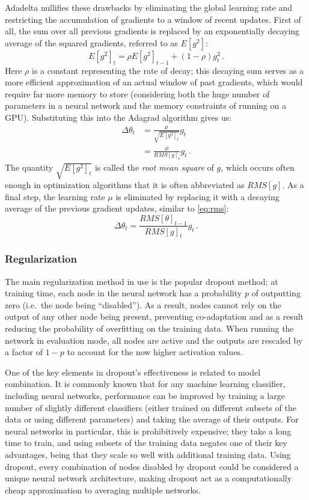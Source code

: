 Adadelta nullifies these drawbacks by eliminating the global learning rate and
restricting the accumulation of gradients to a window of recent updates. First
of all, the sum over all previous gradients is replaced by an exponentially
decaying average of the squared gradients, referred to as $E[g^2]$:
\begin{equation}\label{eq:rms}
  E[g^2]_t = \rho E[g^2]_{t-1} + (1 - \rho) g_t^2\,.
\end{equation}
Here $\rho$ is a constant representing the rate of decay; this decaying sum
serves as a more efficient approximation of an actual window of past gradients,
which would require far more memory to store (considering both the huge number
of parameters in a neural network and the memory constraints of running on a GPU).
Substituting this into the Adagrad algorithm gives us:
\begin{align}
  \Delta\theta_t &= \frac{\mu}{\sqrt{E[g^2]_t}} g_{t} \\
		 &= \frac{\mu}{RMS[g]_t} g_{t}\,.
\end{align}
The quantity $\sqrt{E[g^2]_t}$ is called the \emph{root mean square} of $g$,
which occurs often enough in optimization algorithms that it is often
abbreviated as $RMS[g]$. As a final step, the learning rate $\mu$ is eliminated
by replacing it with a decaying average of the previous gradient updates,
similar to \cref{eq:rms}:
\begin{equation}
  \Delta\theta_t = \frac{RMS[\theta]_{t-1}}{RMS[g]_t} g_{t}\,.
\end{equation}

\subsubsection{Regularization}\label{sec:reg}
The main regularization method in use is the popular dropout\citep{dropout}
method; at training time, each node in the neural network has a probability $p$ of outputting
zero (i.e.\ the node being ``disabled''). As a result, nodes cannot rely on
the output of any other node being present, preventing co-adaptation and as a
result reducing the probability of overfitting on the training data.
When running the network in evaluation mode,
all nodes are active and the outputs are rescaled by a factor of $1 - p$ to
account for the now higher activation values.

One of the key elements in dropout's effectiveness is related to model
combination. It is commonly known that for any machine learning classifier,
including neural networks, performance can be improved by training a large
number of slightly different classifiers (either trained on different subsets
of the data or using different parameters) and taking the average of their
outputs. For neural networks in particular, this is prohibitively expensive;
they take a long time to train, and using subsets of the training data negates
one of their key advantages, being that they scale so well with additional
training data. Using dropout, every combination of nodes disabled by dropout
could be considered a unique neural network architecture, making dropout act
as a computationally cheap approximation to averaging multiple networks.

